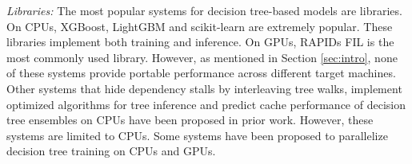 \emph{Libraries:} The most popular systems for decision tree-based models 
are libraries. On CPUs, XGBoost\cite{XGBoost}, LightGBM\cite{LightGBM} and
scikit-learn\cite{Sklearn} are extremely popular. These libraries implement both 
training and inference. On GPUs, RAPIDs FIL\cite{FIL} is the most commonly used 
library. However, as mentioned in Section \ref{sec:intro}, none of these systems
provide portable performance across different target machines.
Other systems that hide dependency stalls by interleaving tree walks\cite{VPred},
implement optimized algorithms for tree inference\cite{QuickScorer, QuickScorer1}
and predict cache performance of decision tree ensembles on CPUs\cite{CacheConscious1, CacheConscious2}
have been proposed in prior work. However, these systems are limited to CPUs.
Some systems have been proposed 
to parallelize decision tree training on CPUs and GPUs\cite{Jansson2014gpuRFAG, Nasridinov2013DecisionTC}.




